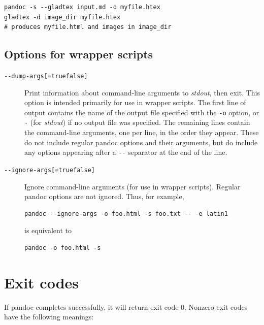\documentclass[
  b5paper
]{book}
\begin{document}
\begin{description}
\begin{verbatim}
pandoc -s --gladtex input.md -o myfile.htex
gladtex -d image_dir myfile.htex
# produces myfile.html and images in image_dir
\end{verbatim}
\end{description}

\section{Options for wrapper scripts}\label{options-for-wrapper-scripts}

\begin{description}
\item[\texttt{-\/-dump-args{[}=true\textbar{}false{]}}]
Print information about command-line arguments to \emph{stdout}, then
exit. This option is intended primarily for use in wrapper scripts. The
first line of output contains the name of the output file specified with
the \texttt{-o} option, or \texttt{-} (for \emph{stdout}) if no output
file was specified. The remaining lines contain the command-line
arguments, one per line, in the order they appear. These do not include
regular pandoc options and their arguments, but do include any options
appearing after a \texttt{-\/-} separator at the end of the line.
\item[\texttt{-\/-ignore-args{[}=true\textbar{}false{]}}]
Ignore command-line arguments (for use in wrapper scripts). Regular
pandoc options are not ignored. Thus, for example,

\begin{verbatim}
pandoc --ignore-args -o foo.html -s foo.txt -- -e latin1
\end{verbatim}

is equivalent to

\begin{verbatim}
pandoc -o foo.html -s
\end{verbatim}
\end{description}

\chapter{Exit codes}\label{exit-codes}

If pandoc completes successfully, it will return exit code 0. Nonzero
exit codes have the following meanings:
\end{document}
